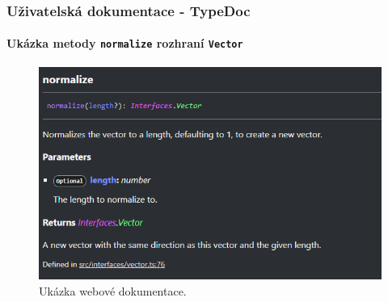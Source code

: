 \begin{frame}
    \frametitle{Uživatelská dokumentace - TypeDoc}
    \framesubtitle{Ukázka metody \texttt{normalize} rozhraní \texttt{Vector}}
    \begin{figure}
        \centering
        \includegraphics[height=0.65\textheight]{../resources/vector-normalize-documentation-typedoc.png}
        \caption{Ukázka webové dokumentace.}
    \end{figure}
\end{frame}


